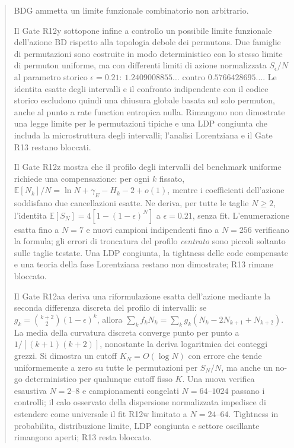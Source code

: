 \documentclass[11pt,a4paper]{article}
\begin{document}
\begin{abstract}
BDG ammetta un limite funzionale combinatorio non arbitrario.


Il Gate R12y sottopone infine a controllo un possibile limite funzionale dell'azione BD rispetto alla topologia debole dei permutons. Due famiglie di permutazioni sono costruite in modo deterministico con lo stesso limite di permuton uniforme, ma con differenti limiti di azione normalizzata $S_\epsilon/N$ al parametro storico $\epsilon=0.21$: $1.2409008855\ldots$ contro $0.5766428695\ldots$. Le identita esatte degli intervalli e il confronto indipendente con il codice storico escludono quindi una chiusura globale basata sul solo permuton, anche al punto a rate function entropica nulla. Rimangono non dimostrate una legge limite per le permutazioni tipiche e una LDP congiunta che includa la microstruttura degli intervalli; l'analisi Lorentziana e il Gate R13 restano bloccati.


Il Gate R12z mostra che il profilo degli intervalli del benchmark uniforme richiede una compensazione: per ogni $k$ fissato, $\mathbb E[N_k]/N=\ln N+\gamma_E-H_k-2+o(1)$, mentre i coefficienti dell'azione soddisfano due cancellazioni esatte. Ne deriva, per tutte le taglie $N\ge2$, l'identita $\mathbb E[S_N]=4[1-(1-\epsilon)^N]$ a $\epsilon=0.21$, senza fit. L'enumerazione esatta fino a $N=7$ e nuovi campioni indipendenti fino a $N=256$ verificano la formula; gli errori di troncatura del profilo \emph{centrato} sono piccoli soltanto sulle taglie testate. Una LDP congiunta, la tightness delle code compensate e una teoria della fase Lorentziana restano non dimostrate; R13 rimane bloccato.


Il Gate R12aa deriva una riformulazione esatta dell'azione mediante la seconda differenza discreta del profilo di intervalli: se $g_k=\binom{k+2}{2}(1-\epsilon)^k$, allora $\sum_k f_kN_k=\sum_k g_k(N_k-2N_{k+1}+N_{k+2})$. La media della curvatura discreta converge punto per punto a $1/[(k+1)(k+2)]$, nonostante la deriva logaritmica dei conteggi grezzi. Si dimostra un cutoff $K_N=O(\log N)$ con errore che tende uniformemente a zero su tutte le permutazioni per $S_N/N$, ma anche un no-go deterministico per qualunque cutoff fisso $K$. Una nuova verifica esaustiva $N=2$--$8$ e campionamenti congelati $N=64$--$1024$ passano i controlli; il calo osservato della dispersione normalizzata impedisce di estendere come universale il fit R12w limitato a $N=24$--$64$. Tightness in probabilita, distribuzione limite, LDP congiunta e settore oscillante rimangono aperti; R13 resta bloccato.



\end{abstract}
\end{document}
